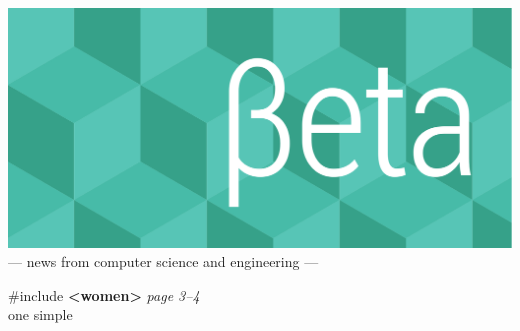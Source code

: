 \documentclass[twoside]{article}
\date{29 July 2015}
\begin{document}
\thispagestyle{empty}
\begingroup%
\vspace*{-3.5cm}\centering\hspace*{-2.8cm}%
\includegraphics[trim=0mm 20mm 0mm 0mm, clip, width=22cm]{../../style/beta-logo.pdf}%
\vspace{1em}
{\sffamily\fontsize{32pt}{32pt}\selectfont --- news from computer science and engineering ---}
\endgroup\vspace*{3ex}

\center
\vfill
{\sffamily\fontsize{72pt}{72pt}\selectfont \#include {\bfseries <women>}}%
\hfill{\rmfamily\fontsize{14pt}{14pt}\selectfont\it page 3--4}\\
{\sffamily\fontsize{18pt}{18pt}\selectfont%
one simple 
}
\endcenter
\end{document}
